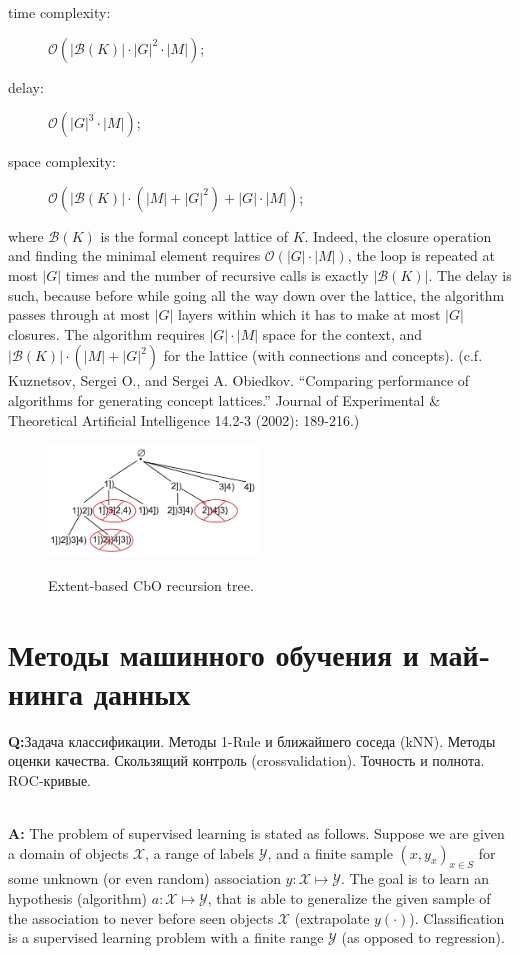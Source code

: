 \documentclass[a4paper,14pt]{extarticle}
\newcommand{\Xcal}{\mathcal{X}}
\newcommand{\Ycal}{\mathcal{Y}}
\newcommand{\rus}[1]{\foreignlanguage{russian}{#1}}
\begin{document}
\begin{description}
    \item[time complexity:] $\mathcal{O}(|\mathcal{B}(K)|\cdot |G|^2 \cdot |M|)$;
    \item[delay:] $\mathcal{O}(|G|^3 \cdot |M|)$;
    \item[space complexity:] $\mathcal{O}(|\mathcal{B}(K)|\cdot(|M| + |G|^2)
                                          + |G| \cdot |M|)$;
\end{description}
where $\mathcal{B}(K)$ is the formal concept lattice of $K$. Indeed, the closure
operation and finding the minimal element requires $\mathcal{O}(|G| \cdot |M|)$,
the loop is repeated at most $|G|$ times and the number of recursive calls is exactly
$|\mathcal{B}(K)|$. The delay is such, because before while going all the way down
over the lattice, the algorithm passes through at most $|G|$ layers within which
it has to make at most $|G|$ closures. The algorithm requires $|G| \cdot |M|$ space
for the context, and $|\mathcal{B}(K)|\cdot(|M| + |G|^2)$ for the lattice (with
connections and concepts).
(c.f. Kuznetsov, Sergei O., and Sergei A. Obiedkov. ``Comparing performance of algorithms
for generating concept lattices.'' Journal of Experimental \& Theoretical Artificial
Intelligence 14.2-3 (2002): 189-216.)
\begin{figure}
    \centering
    \includegraphics[width=0.5\textwidth]{cbo_tree.png}
    \label{fig:cbo_tree}
    \caption{Extent-based CbO recursion tree.}
\end{figure}


\section{\rus{Методы машинного обучения и майнинга данных}} %
\label{sec:mldm}

\noindent\textbf{Q:}\rus{Задача классификации.  Методы 1-Rule и ближайшего соседа
(kNN). Методы оценки качества. Скользящий контроль (crossvalidation). Точность и
полнота. ROC-кривые.}

\hfill\\\textbf{A:}
The problem of supervised learning is stated as follows. Suppose we are given a
domain of objects $\Xcal$, a range of labels $\Ycal$, and a finite sample $(x, y_x)_{x\in S}$
for some unknown (or even random) association $y:\Xcal\mapsto\Ycal$. The goal is
to learn an hypothesis (algorithm) $a:\Xcal\mapsto\Ycal$, that is able to generalize
the given sample of the association to never before seen objects $\Xcal$ (extrapolate
$y(\cdot)$). Classification is a supervised learning problem with a finite range
$\Ycal$ (as opposed to regression).
\end{document}
